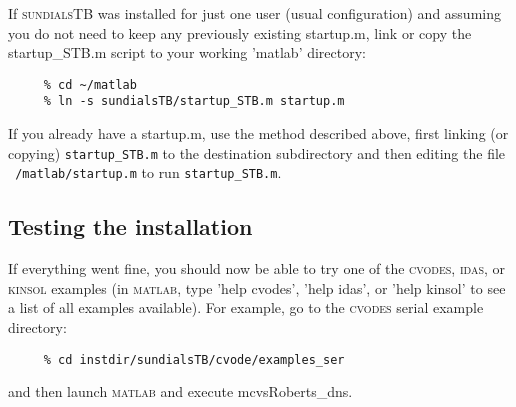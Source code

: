 \documentclass[titlepage,10pt]{article}
\newcommand{\sundialsTB}{{\normalfont\scshape sundialsTB}}
\newcommand{\cvodes}{{\normalfont\scshape cvodes}}
\newcommand{\idas}{{\normalfont\scshape idas}}
\newcommand{\kinsol}{{\normalfont\scshape kinsol}}
\newcommand{\matlab}{{\normalfont\scshape matlab}}
\begin{document}
If {\sundialsTB} was installed for just one user (usual configuration) and
assuming you do not need to keep any previously existing startup.m, link 
or copy the startup\_STB.m script to your working 'matlab' directory:

\begin{verbatim}
     % cd ~/matlab
     % ln -s sundialsTB/startup_STB.m startup.m
\end{verbatim}

If you already have a startup.m, use the method described above, first linking 
(or copying) {\tt startup\_STB.m} to the destination subdirectory and then editing 
the file {\tt ~/matlab/startup.m} to run {\tt startup\_STB.m}.

\subsection{Testing the installation}

If everything went fine, you should now be able to try one of the {\cvodes}, {\idas},
or {\kinsol} examples (in {\matlab}, type 'help cvodes', 'help idas', or 'help kinsol' 
to see a list of all examples available). For example, go to the {\cvodes} serial 
example directory:
\begin{verbatim}
     % cd instdir/sundialsTB/cvode/examples_ser
\end{verbatim}
and then launch {\matlab} and execute mcvsRoberts\_dns.
\end{document}
